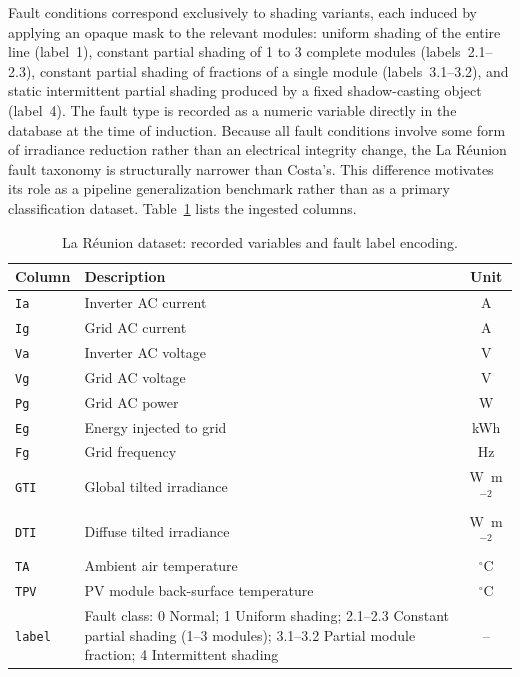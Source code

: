 Fault conditions correspond exclusively to shading variants, each induced by applying an opaque mask to the relevant modules: uniform shading of the entire line (label~1), constant partial shading of 1 to 3 complete modules (labels~2.1--2.3), constant partial shading of fractions of a single module (labels~3.1--3.2), and static intermittent partial shading produced by a fixed shadow-casting object (label~4). The fault type is recorded as a numeric variable directly in the database at the time of induction. Because all fault conditions involve some form of irradiance reduction rather than an electrical integrity change, the La Réunion fault taxonomy is structurally narrower than Costa's. This difference motivates its role as a pipeline generalization benchmark rather than as a primary classification dataset. Table~\ref{tab:reunion-vars} lists the ingested columns.

\begin{table}[H]
\centering
\caption{La Réunion dataset: recorded variables and fault label encoding.}
\label{tab:reunion-vars}
\begin{tabular}{l p{7.5cm} c}
\toprule
\textbf{Column} & \textbf{Description} & \textbf{Unit} \\
\midrule
\texttt{Ia}    & Inverter AC current & A \\
\texttt{Ig}    & Grid AC current & A \\
\texttt{Va}    & Inverter AC voltage & V \\
\texttt{Vg}    & Grid AC voltage & V \\
\texttt{Pg}    & Grid AC power & W \\
\texttt{Eg}    & Energy injected to grid & kWh \\
\texttt{Fg}    & Grid frequency & Hz \\
\texttt{GTI}   & Global tilted irradiance & W~m$^{-2}$ \\
\texttt{DTI}   & Diffuse tilted irradiance & W~m$^{-2}$ \\
\texttt{TA}    & Ambient air temperature & $^\circ$C \\
\texttt{TPV}   & PV module back-surface temperature & $^\circ$C \\
\texttt{label} & Fault class: 0 Normal; 1 Uniform shading; 2.1--2.3 Constant partial shading (1--3 modules); 3.1--3.2 Partial module fraction; 4 Intermittent shading & -- \\
\bottomrule
\end{tabular}
\end{table}

